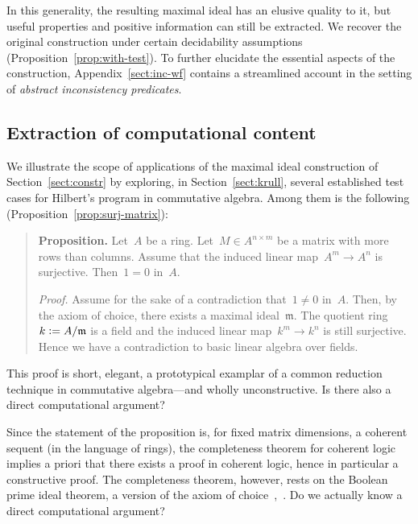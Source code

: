 \documentclass[com,11pt,crcready]{iosart2x}
\theoremstyle{definition}
\theoremstyle{plain}
\theoremstyle{remark}
\newcommand{\?}{\,{:}\,}
\newcommand{\mmm}{\mathfrak{m}}
\newcommand{\defeq}{\vcentcolon=}
\renewcommand{\_}{\mathpunct{.}\,}
\begin{document}
In this generality, the resulting
maximal ideal has an elusive quality to it, but useful properties and positive information can still be
extracted. We recover the original construction under certain
decidability assumptions (Proposition~\ref{prop:with-test}). To further
elucidate the essential aspects of the construction, Appendix~\ref{sect:inc-wf}
contains a streamlined account in the setting of \emph{abstract inconsistency
predicates}.


\subsection*{Extraction of computational content} We illustrate the scope of
applications of the maximal ideal construction of Section~\ref{sect:constr} by
exploring, in Section~\ref{sect:krull}, several established test cases for
Hilbert's program in commutative algebra. Among them is the following
(Proposition~\ref{prop:surj-matrix}):
\begin{quote}\small
\textbf{Proposition.} Let~$A$ be a ring. Let~$M \in A^{n \times m}$ be a matrix with more rows
than columns. Assume that the induced linear map~$A^m \to A^n$ is surjective.
Then~$1 = 0$ in~$A$.
\smallskip

\emph{Proof.} Assume for the sake of a contradiction that~$1 \neq 0$ in~$A$.
Then, by the axiom of choice, there exists a maximal ideal~$\mmm$. The quotient
ring~$k \defeq A/\mmm$ is a field and the induced linear map~$k^m \to k^n$ is
still surjective. Hence we have a contradiction to basic linear algebra over fields.
\end{quote}
This proof is short, elegant, a prototypical examplar of a common reduction
technique in commutative algebra---and wholly unconstructive. Is there also a
direct computational argument?

Since the statement of the proposition is, for fixed matrix dimensions, a
coherent sequent (in the language of rings), the completeness
theorem for coherent logic~\cite[Corollary~D1.5.10]{johnstone:elephant} implies a priori that there exists a proof in
coherent logic, hence in particular a constructive proof. The completeness
theorem, however, rests on the Boolean prime ideal theorem, a version of the
axiom of choice~\cite[Remark~D1.5.11]{johnstone:elephant},~\cite{scott:prime,henkin:metamath,banaschewski:ultrafilter}. Do we actually know a direct computational argument?
\end{document}
